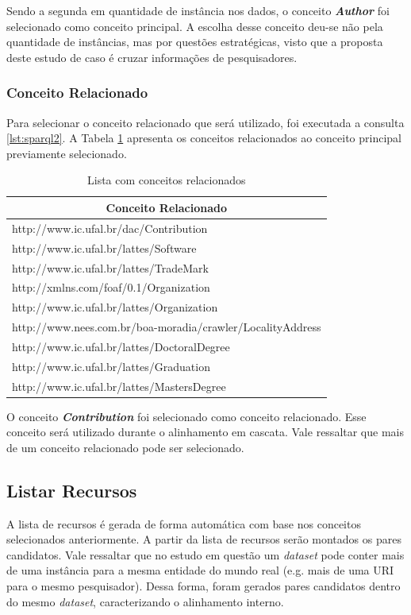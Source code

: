Sendo a segunda em quantidade de instância nos dados, o conceito \textbf{\textit{Author}} foi selecionado como conceito principal. A escolha desse conceito deu-se não pela quantidade de instâncias, mas por questões estratégicas, visto que a proposta deste estudo de caso é cruzar informações de pesquisadores.

\subsubsection{Conceito Relacionado}
Para selecionar o conceito relacionado que será utilizado, foi executada a consulta \ref{lst:sparql2}. A Tabela \ref{tab:estudo_sparql2} apresenta os conceitos relacionados ao conceito principal previamente selecionado.

\begin{table}[h]
	\centering
	\caption{Lista com conceitos relacionados}
	\label{tab:estudo_sparql2}
	\begin{tabular}{@{}|l|@{}}
		\hline
		\multicolumn{1}{|c|}{\textbf{Conceito Relacionado}}        \\ \hline
		http://www.ic.ufal.br/dac/Contribution                     \\ \hline
		http://www.ic.ufal.br/lattes/Software                      \\ \hline
		http://www.ic.ufal.br/lattes/TradeMark                     \\ \hline
		http://xmlns.com/foaf/0.1/Organization                     \\ \hline
		http://www.ic.ufal.br/lattes/Organization                  \\ \hline
		http://www.nees.com.br/boa-moradia/crawler/LocalityAddress \\ \hline
		http://www.ic.ufal.br/lattes/DoctoralDegree                \\ \hline
		http://www.ic.ufal.br/lattes/Graduation                    \\ \hline
		http://www.ic.ufal.br/lattes/MastersDegree                 \\ \hline
	\end{tabular}
\end{table}
 
O conceito \textbf{\textit{Contribution}} foi selecionado como conceito relacionado. Esse conceito será utilizado durante o alinhamento em cascata. Vale ressaltar que mais de um conceito relacionado pode ser selecionado.
 
\subsection{Listar Recursos}
A lista de recursos é gerada de forma automática com base nos conceitos selecionados anteriormente. A partir da lista de recursos serão montados os pares candidatos. Vale ressaltar que no estudo em questão um \textit{dataset} pode conter mais de uma instância para a mesma entidade do mundo real (e.g. mais de uma URI para o mesmo pesquisador). Dessa forma, foram gerados pares candidatos dentro do mesmo \textit{dataset}, caracterizando o alinhamento interno.

